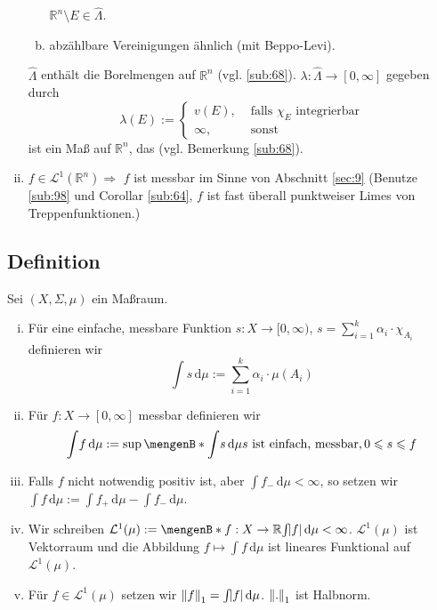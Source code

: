 \begin{enumerate}[(i)]
\begin{enumerate}[a)]
		$\mathds{R}^n \setminus E \in \hat \Lambda$.
		\item abzählbare Vereinigungen ähnlich (mit Beppo-Levi).
	\end{enumerate}
	$\hat \Lambda$ enthält die Borelmengen auf $\mathds{R}^n$ (vgl. \ref{sub:68}). $\lambda : \hat \Lambda \to [0,\infty]  $ gegeben durch 
	\[
		\lambda (E) := \begin{cases}
			v(E), &\text{ falls } \chi_E \text{ integrierbar}\\
			\infty, &\text{ sonst }
		\end{cases}
	\]
	ist ein Maß auf $\mathds{R}^n$, das   (vgl. Bemerkung \ref{sub:68}). 
	\item $f \in \mathcal{L}^1(\mathds{R}^n) \Rightarrow $ $f$ ist messbar im Sinne von Abschnitt \ref{sec:9}
	(Benutze \ref{sub:98} und Corollar \ref{sub:64}, $f$ ist fast überall punktweiser Limes von Treppenfunktionen.)
\end{enumerate}

\subsection[{Definition: Integrierbarkeit, $\norm[1]{.} $ in Maßräumen}]{Definition} %
\label{sub:917}
Sei $(X,\Sigma, \mu)$ ein Maßraum. 
\begin{enumerate}[(i)]
	\item Für eine einfache, messbare Funktion $s : X \to [0,\infty)$, $s = \sum_{i=1}^{k} \alpha_i \cdot \chi_{A_i}$ definieren wir
	\[
		\int\! s  \, \mathrm{d}\mu := \sum_{i=1}^{k} \alpha_i \cdot \mu(A_i)
	\]
	\item Für $f : X \to [0,\infty]$ messbar definieren wir 
	\[
		\int\! f  \, \mathrm{d}\mu := \sup \set[\int\! s  \, \mathrm{d}\mu]{s \text{ ist einfach, messbar}, 0 \le s \le f} 
	\]
	\item Falls $f$ nicht notwendig positiv ist, aber $\int\! f_-  \, \mathrm{d}\mu < \infty$, so setzen wir $\int\! f  \, \mathrm{d}\mu := \int\! f_+  \, \mathrm{d}\mu -
	\int\! f_-  \, \mathrm{d}\mu $.
	\item Wir schreiben $\mathcal{L}^1(\mu) := \set[f : X \to \mathds{R}]{\int\! \abs*{f}  \, \mathrm{d}\mu < \infty }$. $\mathcal{L}^1(\mu)$ ist Vektorraum und die
	Abbildung $f \mapsto\int\! f  \, \mathrm{d}\mu$ ist lineares Funktional auf $\mathcal{L}^1(\mu)$.
	\item Für $f \in \mathcal{L}^1(\mu)$ setzen wir $\norm[1]{f} = \int\! \abs*{f}  \, \mathrm{d}\mu$. $\norm[1]{.} $ ist Halbnorm.
\end{enumerate}

